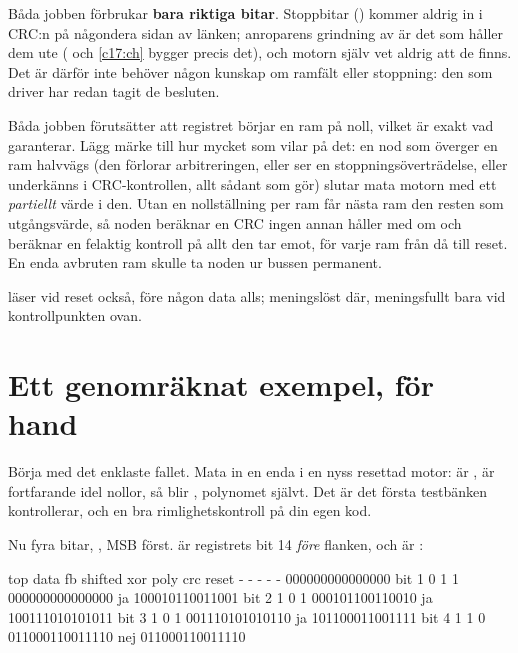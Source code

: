 Båda jobben förbrukar \textbf{bara riktiga bitar}. Stoppbitar () kommer aldrig in i
CRC:n på någondera sidan av länken; anroparens grindning av  är det som håller dem ute
( och \ref{c17:ch} bygger precis det), och motorn själv vet aldrig att de finns. Det
är därför  inte behöver någon kunskap om ramfält eller stoppning: den som driver
 har redan tagit de besluten.

Båda jobben förutsätter att registret börjar en ram på noll, vilket är exakt vad 
garanterar. Lägg märke till hur mycket som vilar på det: en nod som överger en ram halvvägs (den
förlorar arbitreringen, eller ser en stoppningsöverträdelse, eller underkänns i CRC-kontrollen, allt
sådant som  gör) slutar mata motorn med ett \emph{partiellt} värde i den. Utan en
nollställning per ram får nästa ram den resten som utgångsvärde, så noden beräknar en CRC ingen annan
håller med om och beräknar en felaktig kontroll på allt den tar emot, för varje ram från då till
reset. En enda avbruten ram skulle ta noden ur bussen permanent.

 läser  vid reset också, före någon data alls; meningslöst där, meningsfullt
bara vid kontrollpunkten ovan.

\section{Ett genomräknat exempel, för hand}
\label{c13:sec:worked}

Börja med det enklaste fallet. Mata in en enda  i en nyss resettad motor:  är
,  är fortfarande idel nollor, så  blir
, polynomet självt. Det är det första testbänken kontrollerar, och en bra
rimlighetskontroll på din egen kod.

Nu fyra bitar, , MSB först.  är registrets bit 14 \emph{före} flanken, och
 är :

\begin{textdrawing}
         top  data  fb   shifted          xor poly   crc
reset      -     -   -   -                       -   000000000000000
bit 1      0     1   1   000000000000000        ja   100010110011001
bit 2      1     0   1   000101100110010        ja   100111010101011
bit 3      1     0   1   001110101010110        ja   101100011001111
bit 4      1     1   0   011000110011110       nej   011000110011110
\end{textdrawing}

